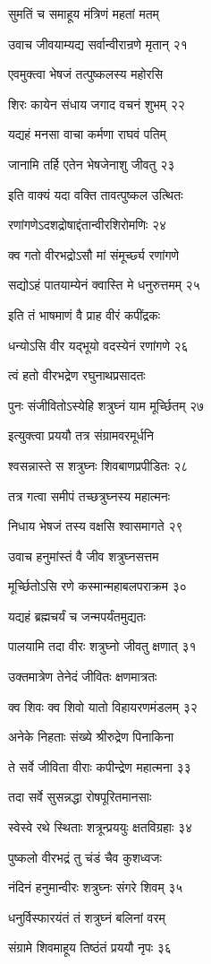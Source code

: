 सुमतिं च समाहूय मंत्रिणं महतां मतम्

उवाच जीवयाम्यद्य सर्वान्वीरान्रणे मृतान् २१

एवमुक्त्वा भेषजं तत्पुष्कलस्य महोरसि

शिरः कायेन संधाय जगाद वचनं शुभम् २२

यद्यहं मनसा वाचा कर्मणा राघवं पतिम्

जानामि तर्हि एतेन भेषजेनाशु जीवतु २३

इति वाक्यं यदा वक्ति तावत्पुष्कल उत्थितः

रणांगणेऽदशद्रोषाद्दंतान्वीरशिरोमणिः २४

क्व गतो वीरभद्रोऽसौ मां संमूर्च्छ्य रणांगणे

सद्योऽहं पातयाम्येनं क्वास्ति मे धनुरुत्तमम् २५

इति तं भाषमाणं वै प्राह वीरं कपींद्रकः

धन्योऽसि वीर यद्भूयो वदस्येनं रणांगणे २६

त्वं हतो वीरभद्रेण रघुनाथप्रसादतः

पुनः संजीवितोऽस्येहि शत्रुघ्नं याम मूर्च्छितम् २७

इत्युक्त्वा प्रययौ तत्र संग्रामवरमूर्धनि

श्वसन्नास्ते स शत्रुघ्नः शिवबाणप्रपीडितः २८

तत्र गत्वा समीपं तच्छत्रुघ्नस्य महात्मनः

निधाय भेषजं तस्य वक्षसि श्वासमागते २९

उवाच हनुमांस्तं वै जीव शत्रुघ्नसत्तम

मूर्च्छितोऽसि रणे कस्मान्महाबलपराक्रम ३०

यद्यहं ब्रह्मचर्यं च जन्मपर्यंतमुद्यतः

पालयामि तदा वीरः शत्रुघ्नो जीवतु क्षणात् ३१

उक्तमात्रेण तेनेदं जीवितः क्षणमात्रतः

क्व शिवः क्व शिवो यातो विहायरणमंडलम् ३२

अनेके निहताः संख्ये श्रीरुद्रेण पिनाकिना

ते सर्वे जीविता वीराः कपीन्द्रेण महात्मना ३३

तदा सर्वे सुसन्नद्धा रोषपूरितमानसाः

स्वेस्वे रथे स्थिताः शत्रून्प्रययुः क्षतविग्रहाः ३४

पुष्कलो वीरभद्रं तु चंडं चैव कुशध्वजः

नंदिनं हनुमान्वीरः शत्रुघ्नः संगरे शिवम् ३५

धनुर्विस्फारयंतं तं शत्रुघ्नं बलिनां वरम्

संग्रामे शिवमाहूय तिष्ठंतं प्रययौ नृपः ३६

